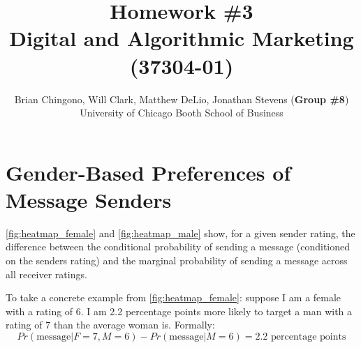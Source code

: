 



\title{Homework \#3\\
Digital and Algorithmic Marketing (37304-01)}
\author{
Brian Chingono, Will Clark, Matthew DeLio, Jonathan Stevens (\textbf{Group \#8})\\
University of Chicago Booth School of Business}

\maketitle

\section{Gender-Based Preferences of Message Senders}

\cref{fig:heatmap_female} and \cref{fig:heatmap_male} show, for a given sender rating, the difference between the conditional probability of sending a message (conditioned on the senders rating) and the marginal probability of sending a message across all receiver ratings. 

To take a concrete example from \cref{fig:heatmap_female}: suppose I am a female with a rating of 6. I am 2.2 percentage points more likely to target a man with a rating of 7 than the average woman is. Formally:
\[ Pr(\text{message}|F=7,M=6) - Pr(\text{message}|M=6) = 2.2 \text{ percentage points}\]

